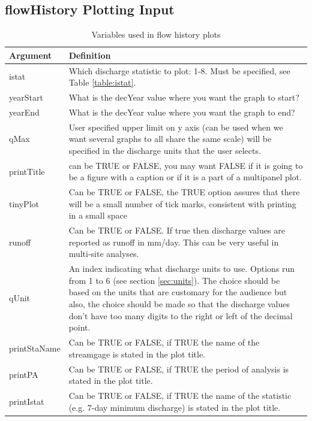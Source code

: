 \documentclass[a4paper,11pt]{article}\usepackage{graphicx, color}
\begin{document}
\subsection{flowHistory Plotting Input}
\label{sec:flowHistoryVariables}
\begin{table}[ht]
\caption{Variables used in flow history plots  \label{tab:flowHistoryVariables}}
\begin{tabularx}{\textwidth}{lX}
\hline
  \textbf{Argument} & \textbf{Definition} \\
\hline
istat & Which discharge statistic to plot: 1-8.  Must be specified, see Table \ref{table:istat}. \\
yearStart\footnotemark[1] & What is the decYear value where you want the graph to start? \\
yearEnd\footnotemark[1] & What is the decYear value where you want the graph to end? \\
qMax & User specified upper limit on y axis (can be used when we want several graphs to all share the same scale) will be specified in the discharge units that the user selects. \\
printTitle & can be TRUE or FALSE, you may want FALSE if it is going to be a figure with a caption or if it is a part of a multipanel plot. \\
tinyPlot & Can be TRUE or FALSE, the TRUE option assures that there will be a small number of tick marks, consistent with printing in a small space \\
runoff & Can be TRUE or FALSE.  If true then discharge values are reported as runoff in mm/day.  This can be very useful in multi-site analyses. \\
qUnit & An index indicating what discharge units to use.  Options run from 1 to 6 (see section \ref{sec:units}).  The choice should be based on the units that are customary for the audience but also, the choice should be made so that the discharge values don't have too many digits to the right or left of the decimal point.\\
printStaName\footnotemark[2] & Can be TRUE or FALSE, if TRUE the name of the streamgage is stated in the plot title. \\
printPA\footnotemark[2] & Can be TRUE or FALSE, if TRUE the period of analysis is stated in the plot title. \\
printIstat\footnotemark[2] & Can be TRUE or FALSE, if TRUE the name of the statistic (e.g. 7-day minimum discharge) is stated in the plot title. \\

\hline
\end{tabularx}

\end{table}
\end{document}
